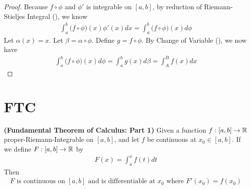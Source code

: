 \documentclass{report}
\begin{document}
\begin{proof}
Because $f\circ \phi$ and  $\phi'$ is integrable on $[a,b]$, by reduction of Riemann-Stieljes Integral (), we know 
\begin{align*}
\int_a^b \big(f\circ \phi)(x)  \phi'(x)dx= \int_a^b \big(f\circ \phi \big)(x)d \phi
\end{align*}
Let $\alpha (x)=x$. Let $\beta = \alpha \circ  \phi$. Define $g=f \circ  \phi $. By Change of Variable (), we now have  
\begin{align*}
\int_a^b \big(f \circ  \phi \big)(x)d \phi =\int_a^b g(x)d\beta = \int_A^B f(x)dx
\end{align*}
\end{proof}




\section{FTC}
\begin{theorem}
  \label{FTC1}
\textbf{(Fundamental Theorem of Calculus: Part 1)} Given a function $f:[a,b]\rightarrow \mathbb{R}$ proper-Riemann-Integrable on $[a,b]$, and let $f$ be continuous at  $x_0 \in [a,b]$. If we define $F:[a,b]\rightarrow \mathbb{R}$ by 
\begin{align*}
F(x)=\int_a^x f(t)dt
\end{align*}
Then 
\begin{align*}
F\text{ is continuous on $[a,b]$ and is differentiable at $x_0$ where $F'(x_0)=f(x_0)$} 
\end{align*}
\end{theorem}
\end{document}
